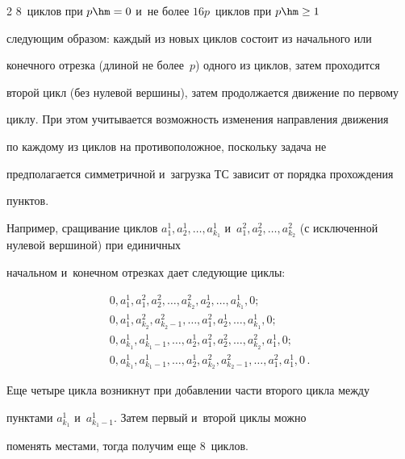 \begin{multicols}{2}
8~цик\-лов при $p\hm =0$ и~не более $16p$~цик\-лов при $p\hm\geq 1$


следующим образом: каждый из новых циклов состоит из начального или


конечного отрезка (длиной не более~$p$) одного из циклов, затем проходится


второй цикл (без нулевой вершины), затем продолжается движение по первому


циклу. При этом учитывается возможность изменения направления движения


по каждому из циклов на противоположное, поскольку задача не


предполагается симметричной и~загрузка ТС зависит от порядка прохождения


пунктов.





  Например, сращивание циклов $a_1^1,a_2^1,\ldots, a^1_{k_1}$ и~$a_1^2,


a_2^2,\ldots, a^2_{k_2}$ (с исключенной нулевой вершиной) при единичных


начальном и~конечном отрезках дает следующие циклы:


  \begin{gather*}


  0, a_1^1, a_1^2, a_2^2,\ldots, a^2_{k_2}, a_2^1,\ldots, a^1_{k_1}, 0;\\


   0, a_1^1, a^2_{k_2}, a^2_{k_2-1},\ldots , a_1^2, a_2^1,\ldots, a^1_{k_1},0;\\


  0,a_{k_1}^1, a^1_{k_1-1}, \ldots, a_2^1, a_1^2, a_2^2,\ldots, a^2_{k_2},


a_1^1,0;\\


  0,a^1_{k_1}, a^1_{k_1-1},\ldots , a_2^1, a^2_{k_2}, a^2_{k_2-1},\ldots, a_1^2,


a_1^1,0\,.


  \end{gather*}





  Еще четыре цикла возникнут при добавлении части второго цикла между


пунктами $a^1_{k_1}$ и~$a^1_{k_1-1}$. Затем первый и~второй циклы можно


поменять мес\-та\-ми, тогда получим еще 8~циклов.






\end{multicols}
